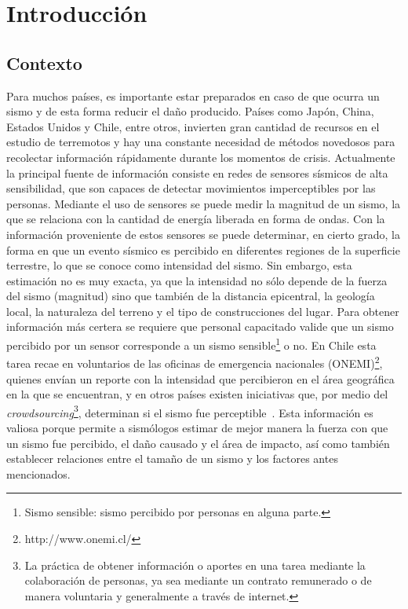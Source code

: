%

\chapter{Introducción}

\section{Contexto}
Para muchos países, es importante estar preparados en caso de que ocurra un sismo y de esta forma reducir el daño producido.
%
Países como Japón, China, Estados Unidos y Chile, entre otros, invierten gran cantidad de recursos en el estudio de terremotos y hay una constante necesidad de métodos novedosos para recolectar información rápidamente durante los momentos de crisis.
%
Actualmente la principal fuente de información consiste en redes de sensores sísmicos de alta sensibilidad, que son capaces de detectar movimientos imperceptibles por las personas. 
%
Mediante el uso de sensores se puede medir la magnitud de un sismo, la que se relaciona con la cantidad de energía liberada en forma de ondas. 
%
Con la información proveniente de estos sensores se puede determinar, en cierto grado, la forma en que un evento sísmico es percibido en diferentes regiones de la superficie terrestre, lo que se conoce como intensidad del sismo. 
%
Sin embargo, esta estimación no es muy exacta, ya que la intensidad no sólo depende de la fuerza del sismo (magnitud) sino que también de la distancia epicentral, la geología local, la naturaleza del terreno y el tipo de construcciones del lugar.
%
Para obtener información más certera se requiere que personal capacitado valide que un sismo percibido por un sensor corresponde a un sismo sensible\footnote{Sismo sensible: sismo percibido por personas en alguna parte.} o no. 
%
En Chile esta tarea recae en voluntarios de las oficinas de emergencia nacionales (ONEMI)\footnote{http://www.onemi.cl/}, quienes envían un reporte con la intensidad que percibieron en el área geográfica en la que se encuentran,
%
y en otros países existen iniciativas que, por medio del \textit{crowdsourcing}\footnote{La práctica de obtener información o aportes en una tarea mediante la colaboración de personas, ya sea mediante un contrato remunerado o de manera voluntaria y generalmente a través de internet.}, determinan si el sismo fue perceptible~\cite{atkinson2007did}.
%
Esta información es valiosa porque permite a sismólogos estimar de mejor manera la fuerza con que un sismo fue percibido, el daño causado y el área de impacto, así como también establecer relaciones entre el tamaño de un sismo y los factores antes mencionados. 


